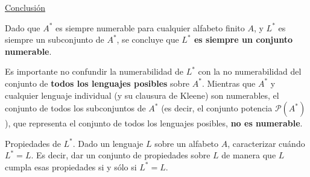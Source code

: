 \documentclass[12pt]{book} %
\begin{document}
\begin{solucion}
\underline{Conclusión}

Dado que \(A^*\) es siempre numerable para cualquier alfabeto finito \(A\), y \(L^*\) es siempre un subconjunto de \(A^*\), se concluye que \textbf{\(L^*\) es siempre un conjunto numerable}.

Es importante no confundir la numerabilidad de \(L^*\) con la no numerabilidad del conjunto de \textbf{todos los lenguajes posibles} sobre \(A^*\). Mientras que \(A^*\) y cualquier lenguaje individual (y su clausura de Kleene) son numerables, el conjunto de todos los subconjuntos de \(A^*\) (es decir, el conjunto potencia \(\mathcal{P}(A^*)\)), que representa el conjunto de todos los lenguajes posibles, \textbf{no es numerable}.

\end{solucion}

\begin{ejercicio}
Propiedades de $L^*$. Dado un lenguaje $L$ sobre un alfabeto $A$, caracterizar cuándo $L^* = L$. Es decir, dar un conjunto de propiedades sobre $L$ de manera que $L$ cumpla esas propiedades si y sólo si $L^* = L$.
\end{ejercicio}
\end{document}
